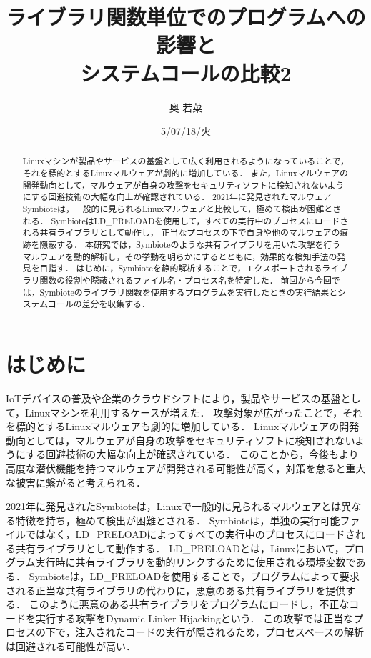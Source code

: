 \documentclass[submit,techreq,noauthor]{eco}	%
\begin{document}
\date   {5/07/18/火}				%
\title  {ライブラリ関数単位でのプログラムへの影響と\\システムコールの比較2}	%
\author {奥 若菜}				%


\begin{abstract}
	Linuxマシンが製品やサービスの基盤として広く利用されるようになっていることで，それを標的とするLinuxマルウェアが劇的に増加している．
  また，Linuxマルウェアの開発動向として，マルウェアが自身の攻撃をセキュリティソフトに検知されないようにする回避技術の大幅な向上が確認されている．
  2021年に発見されたマルウェアSymbioteは，一般的に見られるLinuxマルウェアと比較して，極めて検出が困難とされる．
  SymbioteはLD\_PRELOADを使用して，すべての実行中のプロセスにロードされる共有ライブラリとして動作し，
  正当なプロセスの下で自身や他のマルウェアの痕跡を隠蔽する．
  本研究では，Symbioteのような共有ライブラリを用いた攻撃を行うマルウェアを動的解析し，その挙動を明らかにするとともに，効果的な検知手法の発見を目指す．
  はじめに，Symbioteを静的解析することで，エクスポートされるライブラリ関数の役割や隠蔽されるファイル名・プロセス名を特定した．
  前回から今回では，Symbioteのライブラリ関数を使用するプログラムを実行したときの実行結果とシステムコールの差分を収集する．
\end{abstract}
\maketitle


\section{はじめに}
IoTデバイスの普及や企業のクラウドシフトにより，製品やサービスの基盤として，Linuxマシンを利用するケースが増えた．
攻撃対象が広がったことで，それを標的とするLinuxマルウェアも劇的に増加している\cite{TREND-MICRO}．
Linuxマルウェアの開発動向としては，マルウェアが自身の攻撃をセキュリティソフトに検知されないようにする回避技術の大幅な向上が確認されている\cite{IBM}．
このことから，今後もより高度な潜伏機能を持つマルウェアが開発される可能性が高く，対策を怠ると重大な被害に繋がると考えられる．


2021年に発見されたSymbioteは，Linuxで一般的に見られるマルウェアとは異なる特徴を持ち，極めて検出が困難とされる\cite{Symbiote}．
Symbioteは，単独の実行可能ファイルではなく，LD\_PRELOADによってすべての実行中のプロセスにロードされる共有ライブラリとして動作する．
LD\_PRELOADとは，Linuxにおいて，プログラム実行時に共有ライブラリを動的リンクするために使用される環境変数である．
Symbioteは，LD\_PRELOADを使用することで，プログラムによって要求される正当な共有ライブラリの代わりに，悪意のある共有ライブラリを提供する．
このように悪意のある共有ライブラリをプログラムにロードし，不正なコードを実行する攻撃をDynamic Linker Hijackingという\cite{MITRE-ATT&CK}．
この攻撃では正当なプロセスの下で，注入されたコードの実行が隠されるため，プロセスベースの解析は回避される可能性が高い．
\end{document}
